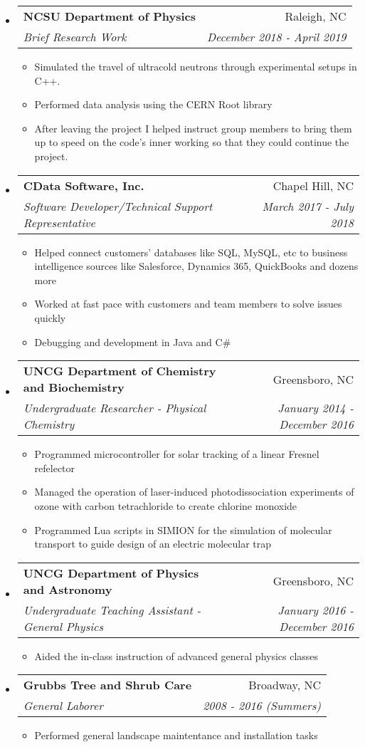 \documentclass[letterpaper,11pt]{article}
\makeatletter
\newcommand{\resitem}[1]{\item #1 \vspace{-2pt}}
\newcommand{\ressubheading}[4]{
\begin{tabular*}{6.5in}{l@{\cftdotfill{\cftsecdotsep}\extracolsep{\fill}}r}
		\textbf{#1} & #2 \\
		\textit{#3} & \textit{#4} \\
\end{tabular*}\vspace{-6pt}}
\makeatother
\begin{document}
\begin{itemize}
\item
	\ressubheading{NCSU Department of Physics}{Raleigh, NC}{Brief Research Work}{December 2018 - April 2019}
	\begin{itemize}
      \resitem{Simulated the travel of ultracold neutrons through experimental setups in C++.}
      \resitem{Performed data analysis using the CERN Root library}
      \resitem{After leaving the project I helped instruct group members to bring them up to speed on the code's inner working so that they could continue the project.}
    
	\end{itemize}

\item
	\ressubheading{CData Software, Inc.}{Chapel Hill, NC}{Software Developer/Technical Support Representative}{March 2017 - July 2018}
	\begin{itemize}
      \resitem{Helped connect customers' databases like SQL, MySQL, etc to business intelligence sources like Salesforce, Dynamics 365, QuickBooks and dozens more }
      \resitem{Worked at fast pace with customers and team members to solve issues quickly}
      \resitem{Debugging and development in Java and C\#}
      
	\end{itemize}

\item
	\ressubheading{UNCG Department of Chemistry and Biochemistry}{Greensboro, NC}{Undergraduate Researcher - Physical Chemistry}{January 2014 - December 2016}
	\begin{itemize}
      \resitem{Programmed microcontroller for solar tracking of a linear Fresnel refelector }
      \resitem{Managed the operation of laser-induced photodissociation experiments of ozone with carbon tetrachloride to create chlorine monoxide}
      \resitem{Programmed Lua scripts in SIMION for the simulation of molecular transport to guide design of an electric molecular trap
}
	\end{itemize}

\item
	\ressubheading{UNCG Department of Physics and Astronomy}{Greensboro, NC}{Undergraduate Teaching Assistant - General Physics}{January 2016 - December 2016}
	\begin{itemize}
      \resitem{Aided the in-class instruction of advanced general physics classes}
     
	\end{itemize}
	
\item
	\ressubheading{Grubbs Tree and Shrub Care}{Broadway, NC}{General Laborer}{2008 - 2016 (Summers)}
	\begin{itemize}
      \resitem{Performed general landscape maintentance and installation tasks}
     
	\end{itemize}

\end{itemize}
\end{document}
